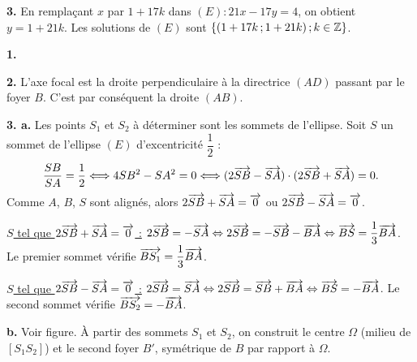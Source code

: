 \documentclass[11pt]{article}
\begin{document}
\textbf{3.} En remplaçant $x$ par $1 + 17k$ dans $(E) : 21x - 17y = 4$, on obtient $y = 1 + 21k$. Les solutions de $(E)$ sont $\{(1 + 17k\,;1 + 21k)\,;k \in \mathbb{Z}\}$.


\textbf{1.} \begin{center}
\end{center}

\textbf{2.} L'axe focal est la droite perpendiculaire à la directrice $(AD)$ passant par le foyer $B$. C'est par conséquent la droite $(AB)$.

\textbf{3. a.} Les points $S_1$ et $S_2$ à déterminer sont les sommets de l'ellipse. Soit $S$ un sommet de l'ellipse $(E)$ d'excentricité $\dfrac{1}{2}$ :
\[ \frac{SB}{SA} = \frac{1}{2} \Longleftrightarrow 4SB^2 - SA^2 = 0 \Longleftrightarrow (2\overrightarrow{SB} - \overrightarrow{SA}) \cdot (2\overrightarrow{SB} + \overrightarrow{SA}) = 0. \]
Comme $A$, $B$, $S$ sont alignés, alors $2\overrightarrow{SB} + \overrightarrow{SA} = \overrightarrow{0}$ ou $2\overrightarrow{SB} - \overrightarrow{SA} = \overrightarrow{0}$.

\underline{$S$ tel que $2\overrightarrow{SB} + \overrightarrow{SA} = \overrightarrow{0}$ :} $2\overrightarrow{SB} = -\overrightarrow{SA} \Leftrightarrow 2\overrightarrow{SB} = -\overrightarrow{SB} - \overrightarrow{BA} \Leftrightarrow \overrightarrow{BS} = \dfrac{1}{3}\overrightarrow{BA}$. Le premier sommet vérifie $\overrightarrow{BS_1} = \dfrac{1}{3}\overrightarrow{BA}$.

\underline{$S$ tel que $2\overrightarrow{SB} - \overrightarrow{SA} = \overrightarrow{0}$ :} $2\overrightarrow{SB} = \overrightarrow{SA} \Leftrightarrow 2\overrightarrow{SB} = \overrightarrow{SB} + \overrightarrow{BA} \Leftrightarrow \overrightarrow{BS} = -\overrightarrow{BA}$. Le second sommet vérifie $\overrightarrow{BS_2} = -\overrightarrow{BA}$.

\textbf{b.} Voir figure. À partir des sommets $S_1$ et $S_2$, on construit le centre $\Omega$ (milieu de $[S_1 S_2]$) et le second foyer $B'$, symétrique de $B$ par rapport à $\Omega$.
\end{document}
